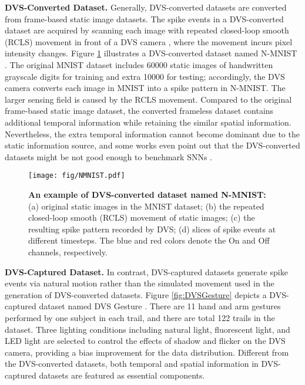 \documentclass[journal,10pt,twocolumn]{IEEETran}
\begin{document}
\textbf{DVS-Converted Dataset.} Generally, DVS-converted datasets are converted from frame-based static image datasets. The spike events in a DVS-converted dataset are acquired by scanning each image with repeated closed-loop smooth (RCLS) movement in front of a DVS camera \cite{serrano2015poker,li2017cifar10}, where the movement incurs pixel intensity changes. Figure \ref{fig:NMNIST} illustrates a DVS-converted dataset named N-MNIST \cite{orchard2015converting}. The original MNIST dataset includes 60000  static images of handwritten grayscale digits for training and extra 10000 for testing; accordingly, the DVS camera converts each image in MNIST into a  spike pattern in N-MNIST. The larger sensing field is caused by the RCLS movement. Compared to the original frame-based static image dataset, the converted frameless dataset contains additional temporal information while retaining the similar spatial information. Nevertheless, the extra temporal information cannot become dominant due to the static information source, and some works even point out that the DVS-converted datasets might be not good enough to benchmark SNNs \cite{iyer2018neuromorphic,deng2020rethinking}. 

\begin{figure}[!htbp]
\centering     
\texttt{[image: fig/NMNIST.pdf]}
\caption{\textbf{An example of DVS-converted dataset named N-MNIST:} (a) original static images in the MNIST dataset; (b) the repeated closed-loop smooth (RCLS) movement of static images; (c) the resulting spike pattern recorded by DVS; (d) slices of spike events at different timesteps. The blue and red colors denote the On and Off channels, respectively.} \label{fig:NMNIST} 
\end{figure}

\textbf{DVS-Captured Dataset.} In contrast, DVS-captured datasets generate spike events via natural motion rather than the simulated movement used in the generation of DVS-converted datasets. Figure \ref{fig:DVSGesture} depicts a DVS-captured dataset named DVS Gesture \cite{amir2017low}. There are 11 hand and arm gestures performed by one subject in each trail, and there are total 122 trails in the dataset. Three lighting conditions including natural light, fluorescent light, and LED light are selected to control the effects of shadow and flicker on the DVS camera, providing a bias improvement for the data distribution. Different from the DVS-converted datasets, both temporal and spatial information in DVS-captured datasets are featured as essential components.
\end{document}
